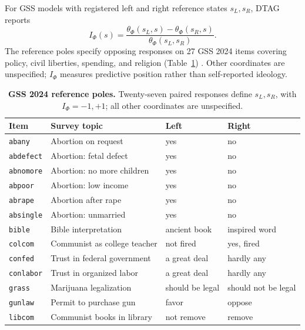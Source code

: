 \documentclass[technote,10pt]{IEEEtran}
\newcommand{\Ph}{\Phi}
\begin{document}
For GSS models with registered left and right reference states $s_L,s_R$, DTAG reports
\begin{equation}
I_\Ph(s)=\frac{\theta_\Ph(s_L,s)-\theta_\Ph(s_R,s)}
{\theta_\Ph(s_L,s_R)}.
\label{eq:ideology}
\end{equation}
The reference poles specify opposing responses on 27 GSS 2024 items covering policy, civil liberties, spending, and religion (Table~\ref{tab:poles}) \cite{dahal2026}. Other coordinates are unspecified; $I_\Ph$ measures predictive position rather than self-reported ideology.

\begin{table}[!t]
\centering
\caption{\textbf{GSS 2024 reference poles.} Twenty-seven paired responses define $s_L,s_R$, with $I_\Phi=-1,+1$; all other coordinates are unspecified. }
\label{tab:poles}
\begingroup
\scriptsize
\setlength{\tabcolsep}{2pt}
\renewcommand{\arraystretch}{1.02}
\begin{minipage}[t]{.495\textwidth}
\begin{tabularx}{\linewidth}{@{}lX>{\raggedright\arraybackslash}p{.70in}>{\raggedright\arraybackslash}p{.70in}@{}}
\toprule
\textbf{Item} & \textbf{Survey topic} & \textbf{Left} & \textbf{Right} \\
\midrule
\texttt{abany} & Abortion on request & yes & no \\
\texttt{abdefect} & Abortion: fetal defect & yes & no \\
\texttt{abnomore} & Abortion: no more children & yes & no \\
\texttt{abpoor} & Abortion: low income & yes & no \\
\texttt{abrape} & Abortion after rape & yes & no \\
\texttt{absingle} & Abortion: unmarried & yes & no \\
\texttt{bible} & Bible interpretation & ancient book & inspired word \\
\texttt{colcom} & Communist as college teacher & not fired & yes, fired \\
\texttt{confed} & Trust in federal government & a great deal & hardly any \\
\texttt{conlabor} & Trust in organized labor & a great deal & hardly any \\
\texttt{grass} & Marijuana legalization & should be legal & should not be legal \\
\texttt{gunlaw} & Permit to purchase gun & favor & oppose \\
\texttt{libcom} & Communist books in library & not remove & remove \\

\end{tabularx}
\end{minipage}
\end{table}
\end{document}
